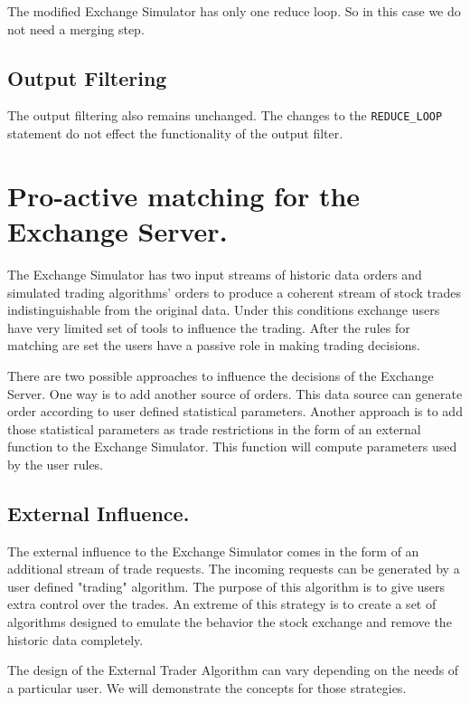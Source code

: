 \documentclass{article}
\begin{document}
The modified Exchange Simulator has only one reduce loop. So in this case we do not need a merging step.

\subsection{Output Filtering}

The output filtering also remains unchanged. The changes to the {\tt REDUCE\_LOOP} statement do not effect the functionality of the output filter.  

\section{Pro-active matching for the Exchange Server.}

The Exchange Simulator has two input streams of historic data orders and simulated trading algorithms' orders to produce a coherent stream of stock trades indistinguishable from the original data. Under this conditions exchange users have very limited set of tools to influence the trading. After the rules for matching are set the users have a passive role in making trading decisions. 

There are two possible approaches to influence the decisions of the Exchange Server. One way is to add another source of orders. This data source can generate order according to user defined statistical parameters. Another approach is to add those statistical parameters as trade restrictions in the form of an external function to the Exchange Simulator. This function will compute parameters used by the user rules.

\subsection{External Influence.}

The external influence to the Exchange Simulator comes in the form of an additional stream of trade requests. The incoming requests can be generated by a user defined "trading" algorithm. The purpose of this algorithm is to give users extra control over the trades. An extreme of this strategy is to create a set of algorithms designed to emulate the behavior the stock exchange and remove the historic data completely. 

The design of the External Trader Algorithm can vary depending on the needs of a particular user. We will demonstrate the concepts for those strategies.
\end{document}
